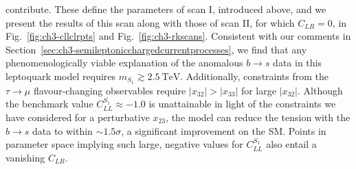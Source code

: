 contribute. These define the parameters of scan I, introduced above, and we
present the results of this scan along with those of scan II, for which
$C_{LR} = 0$, in Fig.~\ref{fig:ch3-cllclrpts} and Fig.~\ref{fig:ch3-rkscans}.
Consistent with our comments in
Section~\ref{sec:ch3-semileptonicchargedcurrentprocesses}, we find that any
phenomenologically viable explanation of the anomalous $b \to s$ data in this
leptoquark model requires $m_{S_{1}} \gtrsim \SI{2.5}{\TeV}$. Additionally,
constraints from the $\tau \to \mu$ flavour-changing observables require
$|x_{32}| > |x_{33}|$ for large $|x_{32}|$. Although the benchmark value
$C_{LL}^{S_{1}} \approx -1.0$ is unattainable in light of the constraints we
have considered for a perturbative $x_{23}$, the model can reduce the tension
with the $b \to s$ data to within $\sim 1.5 \sigma$, a significant improvement
on the SM. Points in parameter space implying such large, negative values for
$C_{LL}^{S_{1}}$ also entail a vanishing $C_{LR}$.

